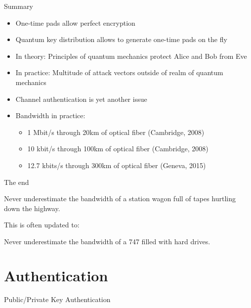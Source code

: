 \documentclass{beamer}
\begin{document}
	\begin{frame}{Summary} %
		\begin{itemize}
			\item One-time pads allow perfect encryption
			\item Quantum key distribution allows to generate one-time pads on the fly
			\item In theory: Principles of quantum mechanics protect Alice and Bob from Eve
			\item In practice: Multitude of attack vectors outside of realm of quantum mechanics
			\item Channel authentication is yet another issue
			\item Bandwidth in practice:
				\begin{itemize}
					\item 1 Mbit/s through 20km of optical fiber (Cambridge, 2008)
					\item 10 kbit/s through 100km of optical fiber (Cambridge, 2008)
					\item 12.7 kbits/s through 300km of optical fiber (Geneva, 2015)
				\end{itemize}
		\end{itemize}
	\end{frame}

	\begin{frame}{The end}
		\begin{shadequote}{}
			Never underestimate the bandwidth of a station wagon full of tapes hurtling down the highway.
		\end{shadequote}

		\vspace{1em}
		This is often updated to:
		\vspace{0.5em}


		\begin{shadequote}{}
			Never underestimate the bandwidth of a 747 filled with hard drives.
		\end{shadequote}
	\end{frame}


	\section{Authentication}

	\begin{frame}{Public/Private Key Authentication} %

	\end{frame}


	\begin{frame}[plain]\end{frame}
\end{document}
